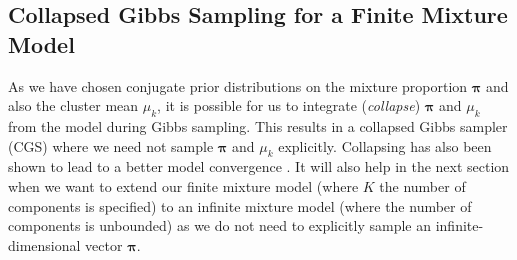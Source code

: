 \subsection{Collapsed Gibbs Sampling for a Finite Mixture Model}

As we have chosen conjugate prior distributions on the mixture proportion $\boldsymbol{\pi}$ and also the cluster mean $\mu_k$, it is possible for us to integrate (\emph{collapse}) $\boldsymbol{\pi}$ and $\mu_k$ from the model during Gibbs sampling. This results in a collapsed Gibbs sampler (CGS) where we need not sample $\boldsymbol{\pi}$ and $\mu_k$ explicitly. Collapsing has also been shown to lead to a better model convergence \cite{gelman2014bayesian}. It will also help in the next section when we want to extend our finite mixture model (where $K$ the number of components is specified) to an infinite mixture model (where the number of components is unbounded) as we do not need to explicitly sample an infinite-dimensional vector $\boldsymbol{\pi}$. 

